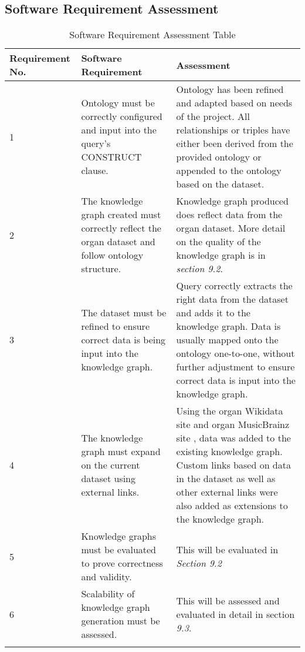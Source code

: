 \subsection{Software Requirement Assessment}
\begin{longtable}{|p{2.25cm}|p{5.5cm}|p{5.5cm}|}

\hline
\textbf{Requirement No.} & \textbf{Software Requirement} & \textbf{Assessment}\\
\hline

1& 
Ontology must be correctly configured and input into the query's CONSTRUCT clause. &
Ontology has been refined and adapted based on needs of the project. All relationships or triples have either been derived from the provided ontology or appended to the ontology based on the dataset. \\
\hline

2&
The knowledge graph created must correctly reflect the organ dataset and follow ontology structure. &
Knowledge graph produced does reflect data from the organ dataset. More detail on the quality of the knowledge graph is in \textit{section 9.2}. \\
\hline

3&
The dataset must be refined to ensure correct data is being input into the knowledge graph. &
Query correctly extracts the right data from the dataset and adds it to the knowledge graph. Data is usually mapped onto the ontology one-to-one, without further adjustment to ensure correct data is input into the knowledge graph. \\
\hline

4&
The knowledge graph must expand on the current dataset using external links. &
Using the organ Wikidata site \cite{organwikidata} and organ MusicBrainz site \cite{organmusicbrainz}, data was added to the existing knowledge graph. Custom links based on data in the dataset as well as other external links were also added as extensions to the knowledge graph. \\
\hline

5&
Knowledge graphs must be evaluated to prove correctness and validity. &
This will be evaluated in \textit{Section 9.2} \\ 
\hline

6&
Scalability of knowledge graph generation must be assessed. &
This will be assessed and evaluated in detail in section \textit{9.3}. \\ 
\hline
\caption{Software Requirement Assessment Table}
\end{longtable}

